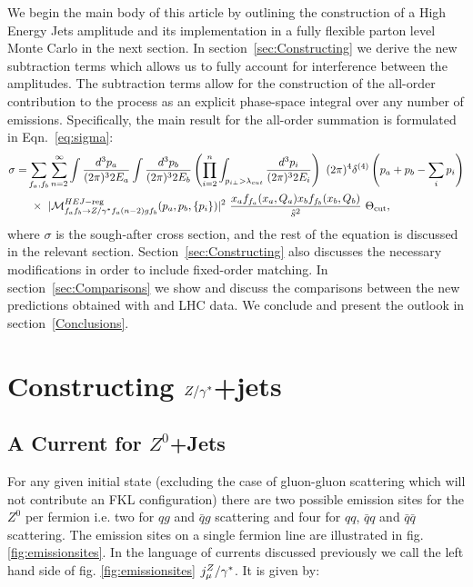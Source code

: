 	We begin the main body of this article by outlining the construction of a
	High Energy Jets amplitude and its implementation in a fully flexible parton
	level Monte Carlo in the next section.  In section~\eqref{sec:Constructing} we
	derive the new subtraction terms which allows us to fully account for
	interference between the amplitudes. The subtraction terms allow for the
	construction of the all-order contribution to the process as an explicit
	phase-space integral over any number of emissions. Specifically, the
	main result for the all-order summation is formulated in
	Eqn.~\eqref{eq:sigma}:
	\begin{align}
	  \nonumber
	  \begin{split}
	    \sigma =& \sum_{f_a,f_b} \sum_{n=2}^\infty \int \frac{d^3 p_a}{(2\pi)^3 2E_a} \int \frac{d^3
	      p_b}{(2\pi)^3 2E_b}  \left( \prod_{i=2}^n \int_{p_{i\perp}>\lambda_{cut}} \frac{d^3 p_i}{(2\pi)^3
	        2E_i} \right)\ (2\pi)^4 \delta^{(4)}\left(p_a+p_b - \sum_i p_i\right) \\
	    & \ \times \ |\mathcal{M}^{HEJ-{\rm reg}}_{f_af_b\to Z/\gamma^*
	      f_a(n-2)gf_b}(p_a,p_b,\{p_i\})|^2 \ \frac{ x_a f_{f_a}(x_a, Q_a) x_b
	      f_{f_b}(x_b,Q_b)}{\hat s^2}\ \Theta_{\rm cut},
	  \end{split}
	\end{align}
	where $\sigma$ is the sough-after cross
	section, and the rest of the equation is discussed in the relevant section. Section~\eqref{sec:Constructing} also discusses the necessary
	modifications in order to include fixed-order matching. In
	section~\eqref{sec:Comparisons} we show and discuss the comparisons between the new
	predictions obtained with \hej and LHC data. We conclude and present the
	outlook in section~\eqref{Conclusions}.

\section{Constructing $Z/\gamma^*$+jets}
	\label{sec:Zcurrents}

	\subsection{A Current for $Z^0$+Jets}

		For any given initial state (excluding the case of gluon-gluon scattering which will
		not contribute an FKL configuration) there are two possible emission sites for the
		$Z^0$ per fermion i.e. two for $qg$ and $\bar qg$ scattering and four for $qq$,
		$\bar qq$ and $\bar q\bar q$ scattering. The emission sites on a single fermion line
		are illustrated in fig. \eqref{fig:emissionsites}.  In the language of currents discussed
		previously we call the left hand side of fig. \eqref{fig:emissionsites} $j_\mu^Z/\gamma^*$.
		It is given by:

